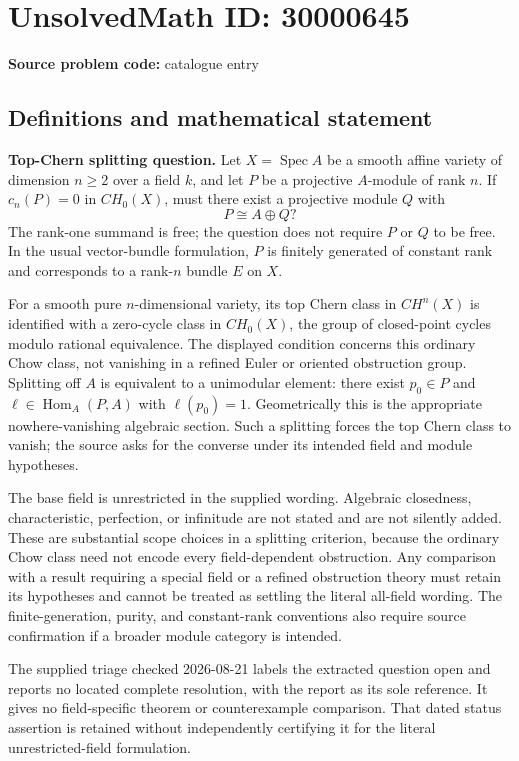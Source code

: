 \documentclass[11pt]{article}
\begin{document}
\section*{UnsolvedMath ID: 30000645}
\textbf{Source problem code:} catalogue entry
\subsection{Definitions and mathematical statement}
\textbf{Top-Chern splitting question.} Let \(X=\operatorname{Spec}A\) be a smooth affine variety of dimension \(n\ge2\) over a field \(k\), and let \(P\) be a projective \(A\)-module of rank \(n\). If \(c_n(P)=0\) in \(CH_0(X)\), must there exist a projective module \(Q\) with\[P\cong A\oplus Q?\] The rank-one summand is free; the question does not require \(P\) or \(Q\) to be free. In the usual vector-bundle formulation, \(P\) is finitely generated of constant rank and corresponds to a rank-\(n\) bundle \(E\) on \(X\).\par For a smooth pure \(n\)-dimensional variety, its top Chern class in \(CH^n(X)\) is identified with a zero-cycle class in \(CH_0(X)\), the group of closed-point cycles modulo rational equivalence. The displayed condition concerns this ordinary Chow class, not vanishing in a refined Euler or oriented obstruction group. Splitting off \(A\) is equivalent to a unimodular element: there exist \(p_0\in P\) and \(\ell\in\operatorname{Hom}_A(P,A)\) with \(\ell(p_0)=1\). Geometrically this is the appropriate nowhere-vanishing algebraic section. Such a splitting forces the top Chern class to vanish; the source asks for the converse under its intended field and module hypotheses.\par The base field is unrestricted in the supplied wording. Algebraic closedness, characteristic, perfection, or infinitude are not stated and are not silently added. These are substantial scope choices in a splitting criterion, because the ordinary Chow class need not encode every field-dependent obstruction. Any comparison with a result requiring a special field or a refined obstruction theory must retain its hypotheses and cannot be treated as settling the literal all-field wording. The finite-generation, purity, and constant-rank conventions also require source confirmation if a broader module category is intended.\par The supplied triage checked 2026-08-21 labels the extracted question open and reports no located complete resolution, with the report as its sole reference. It gives no field-specific theorem or counterexample comparison. That dated status assertion is retained without independently certifying it for the literal unrestricted-field formulation.
\end{document}
